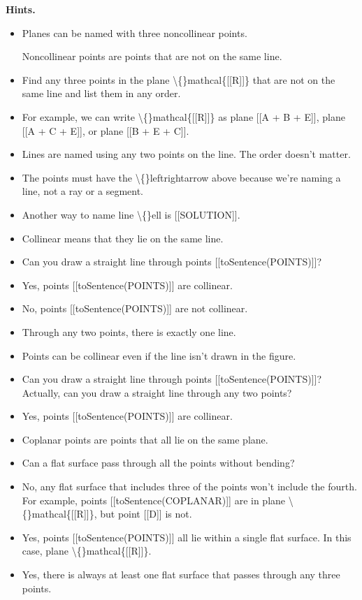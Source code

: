 \documentclass{article}
\begin{document}
\textbf{Hints.}
\begin{itemize}
  \item Planes can be named with three noncollinear points.
                    
                        Noncollinear points are points that are not on the same line.
  \item Find any three points in the plane \textbackslash\{\}mathcal\{[[R]]\} that are
                    not on the same line and list them in any order.
  \item For example, we can write \textbackslash\{\}mathcal\{[[R]]\} as plane
                    [[A + B + E]], plane [[A + C + E]],
                    or plane [[B + E + C]].
  \item Lines are named using any two points on the line. The order doesn't matter.
  \item The points must have the \textbackslash\{\}leftrightarrow above because we're
                naming a line, not a ray or a segment.
  \item Another way to name line \textbackslash\{\}ell is [[SOLUTION]].
  \item Collinear means that they lie on the same line.
  \item Can you draw a straight line through points [[toSentence(POINTS)]]?
  \item Yes, points [[toSentence(POINTS)]] are collinear.
  \item No, points [[toSentence(POINTS)]] are not collinear.
  \item Through any two points, there is exactly one line.
  \item Points can be collinear even if the line isn't drawn in the figure.
  \item Can you draw a straight line through points [[toSentence(POINTS)]]?
                Actually, can you draw a straight line through any two points?
  \item Yes, points [[toSentence(POINTS)]] are collinear.
  \item Coplanar points are points that all lie on the same plane.
  \item Can a flat surface pass through all the points without bending?
  \item No, any flat surface that includes three of the points won't include the fourth.
                    For example, points [[toSentence(COPLANAR)]] are in plane
                    \textbackslash\{\}mathcal\{[[R]]\}, but point [[D]] is not.
  \item Yes, points [[toSentence(POINTS)]] all lie within a single
                    flat surface. In this case, plane \textbackslash\{\}mathcal\{[[R]]\}.
  \item Yes, there is always at least one flat surface that passes through
                    any three points.
\end{itemize}
\end{document}

